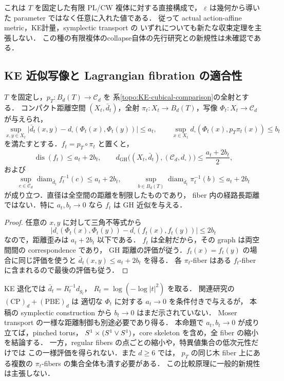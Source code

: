 \begin{remark}[計量収縮の範囲と新規性]
これは $T$ を固定した有限 PL/CW 複体に対する直接構成で，
$\varepsilon$ は幾何から導いた parameter ではなく任意に入れた値である．
従って actual action-affine metric，KE計量，symplectic transport の
いずれについても新たな収束定理を主張しない．
この種の有限複体のcollapse自体の先行研究との新規性は未確認である．
\end{remark}

\subsection{KE 近似写像と Lagrangian fibration の適合性}

\begin{proposition}
\label{topo:ke-map-compatibility}
$T$ を固定し，$p_T:B_d(T)\to\mathcal C_d$ を
系\ref{topo:KE-cubical-comparison}の全射とする．
コンパクト距離空間 $(X_t,\bar d_t)$，全射
$\pi_t:X_t\to B_d(T)$，写像 $\Phi_t:X_t\to\mathcal C_d$ が与えられ，
\[
 \sup_{x,y\in X_t}
 \bigl|\bar d_t(x,y)-d_\square(\Phi_t(x),\Phi_t(y))\bigr|\le a_t,
 \qquad
 \sup_{x\in X_t}d_\square(\Phi_t(x),p_T\pi_t(x))\le b_t
\]
を満たすとする．$f_t=p_T\circ\pi_t$ と置くと，
\[
 \operatorname{dis}(f_t)\le a_t+2b_t,\qquad
 d_{\mathrm{GH}}\bigl((X_t,\bar d_t),(\mathcal C_d,d_\square)\bigr)
 \le \frac{a_t+2b_t}{2},
\]
および
\[
 \sup_{c\in\mathcal C_d}\operatorname{diam}_{\bar d_t}f_t^{-1}(c)
 \le a_t+2b_t,\qquad
 \sup_{b\in B_d(T)}\operatorname{diam}_{\bar d_t}\pi_t^{-1}(b)
 \le a_t+2b_t
\]
が成り立つ．直径は全空間の距離を制限したものであり，
fiber 内の経路長距離ではない．特に $a_t,b_t\to0$ なら $f_t$ は GH 近似を与える．
\end{proposition}
\begin{proof}
任意の $x,y$ に対して三角不等式から
\[
 \bigl|d_\square(\Phi_t(x),\Phi_t(y))
       -d_\square(f_t(x),f_t(y))\bigr|\le2b_t
\]
なので，距離歪みは $a_t+2b_t$ 以下である．
$f_t$ は全射だから，その graph は両空間間の correspondence であり，
GH 距離の評価が従う．$f_t(x)=f_t(y)$ の場合に同じ評価を使うと
$\bar d_t(x,y)\le a_t+2b_t$ を得る．
各 $\pi_t$-fiber はある $f_t$-fiber に含まれるので最後の評価も従う．
\end{proof}

\begin{remark}
KE 退化では $\bar d_t=R_t^{-1}d_{g_t}$，
$R_t=\log(-\log|t|^2)$ を取る．
関連研究\cite{KECubicalCurrent}の $\mathrm{(CP)}_d+\mathrm{(PBE)}_d$ は
適切な $\Phi_t$ に対する $a_t\to0$ を条件付きで与えるが，
本稿の symplectic construction から $b_t\to0$ はまだ示されていない．
Moser transport の一様な距離制御も別途必要であり得る．
本命題で $a_t,b_t\to0$ が成り立てば，pinched torus，
$S^1\times(S^1\vee S^1)$，core skeleton を含め，全 fiber の縮小を結論する．
一方，regular fibers の点ごとの縮小や，特異値集合の低次元性だけでは
この一様評価を得られない．また $d\ge6$ では，
$p_T$ の同じ木 fiber 上にある複数の $\pi_t$-fibers の集合全体も潰す必要がある．
この比較原理に一般的新規性は主張しない．
\end{remark}

